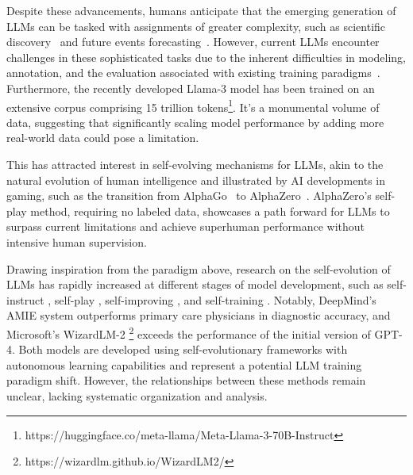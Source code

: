 \documentclass[sn-basic, Numbered]{sn-jnl}%
\theoremstyle{thmstyleone}%
\theoremstyle{thmstyletwo}%
\theoremstyle{thmstylethree}%
\begin{document}
Despite these advancements, humans anticipate that the emerging generation of LLMs can be tasked with assignments of greater complexity, such as scientific discovery~\cite{miret2024llms} and future events forecasting~\cite{schoenegger2024ai}. However, current LLMs encounter challenges in these sophisticated tasks due to the inherent difficulties in modeling, annotation, and the evaluation associated with existing training paradigms~\cite{burns2023weak}.
Furthermore, the recently developed Llama-3 model has been trained on an extensive corpus comprising 15 trillion tokens\footnote{https://huggingface.co/meta-llama/Meta-Llama-3-70B-Instruct}. It's a monumental volume of data, suggesting that significantly scaling model performance by adding more real-world data could pose a limitation.

This has attracted interest in self-evolving mechanisms for LLMs, akin to the natural evolution of human intelligence and illustrated by AI developments in gaming, such as the transition from AlphaGo~\cite{silver2016mastering} to AlphaZero~\cite{silver2017mastering}. AlphaZero's self-play method, requiring no labeled data, showcases a path forward for LLMs to surpass current limitations and achieve superhuman performance without intensive human supervision. 

Drawing inspiration from the paradigm above, research on the self-evolution of LLMs has rapidly increased at different stages of model development, such as self-instruct \cite{wang2023self}, self-play \cite{tu2024towards}, self-improving \cite{huang2022large}, and self-training \cite{gulcehre2023reinforced}. Notably, DeepMind's AMIE system \cite{tu2024towards} outperforms primary care physicians in diagnostic accuracy, and Microsoft's WizardLM-2 
\footnote{https://wizardlm.github.io/WizardLM2/} exceeds the performance of the initial version of GPT-4. 
Both models are developed using self-evolutionary frameworks with autonomous learning capabilities and represent a potential LLM training paradigm shift.
However, the relationships between these methods remain unclear, lacking systematic organization and analysis.
\end{document}
